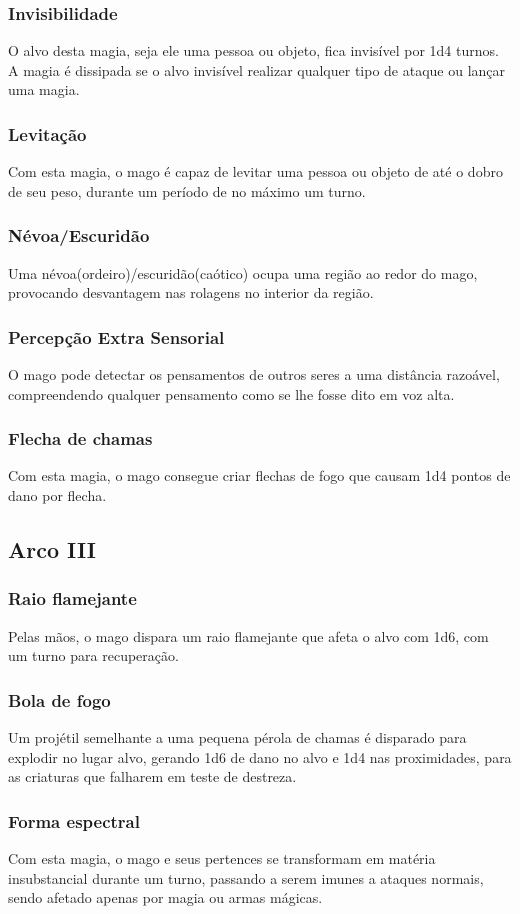 \documentclass[10pt,twoside,twocolumn]{book}
\begin{document}
\subsubsection*{Invisibilidade}
O alvo desta magia, seja ele uma pessoa ou objeto, fica invisível por 1d4 turnos. A magia é dissipada se o alvo invisível realizar qualquer tipo de ataque ou lançar uma magia.
\subsubsection*{Levitação}
Com esta magia, o mago é capaz de levitar uma pessoa ou objeto de até o dobro de seu peso, durante um período de no máximo um turno.
\subsubsection*{Névoa/Escuridão}
Uma névoa(ordeiro)/escuridão(caótico) ocupa uma região ao redor do mago, provocando desvantagem nas rolagens no interior da região.
\subsubsection*{Percepção Extra Sensorial}
O mago pode detectar os pensamentos de outros seres a uma distância razoável, compreendendo qualquer pensamento como se lhe fosse dito em voz alta.
\subsubsection*{Flecha de chamas}
Com esta magia, o mago consegue criar flechas de fogo que causam 1d4 pontos de dano por flecha.

\subsection*{Arco III}
\subsubsection*{Raio flamejante}
Pelas mãos, o mago dispara um raio flamejante que afeta o alvo com 1d6, com um turno para recuperação.
\subsubsection*{Bola de fogo}
Um projétil semelhante a uma pequena pérola de chamas é disparado para explodir no lugar alvo, gerando 1d6 de dano no alvo e 1d4 nas proximidades, para as criaturas que falharem em teste de destreza.
\subsubsection*{Forma espectral}
Com esta magia, o mago e seus pertences se transformam em matéria insubstancial durante um turno, passando a serem imunes a ataques normais, sendo afetado apenas por magia ou armas mágicas.
\end{document}
